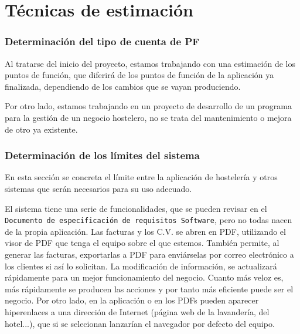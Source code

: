 \documentclass[spanish,a4paper,11pt, twoside]{report}	%
\begin{document}

\part{Técnicas de estimación} %
\section{Determinación del tipo de cuenta de PF}
Al tratarse del inicio del proyecto, estamos trabajando con una estimación de los puntos de función, que diferirá de los puntos de función de la aplicación ya finalizada, dependiendo de los cambios que se vayan produciendo. 

Por otro lado, estamos trabajando en un proyecto de desarrollo de un programa para la gestión de un negocio hostelero, no se trata del mantenimiento o mejora de otro ya existente.

\section{Determinación de los límites del sistema}
En esta sección se concreta el límite entre la aplicación de hostelería y otros sistemas que serán necesarios para su uso adecuado.

El sistema tiene una serie de funcionalidades, que se pueden revisar en el \texttt{Documento de especificación de requisitos Software}, pero no todas nacen de la propia aplicación. Las facturas y los C.V. se abren en PDF, utilizando el visor de PDF que tenga el equipo sobre el que estemos. También permite, al generar las facturas, exportarlas a PDF para enviárselas por correo electrónico a los clientes si así lo solicitan. La modificación de información, se actualizará rápidamente para un mejor funcionamiento del negocio. Cuanto más veloz es, más rápidamente se producen las acciones y por tanto más eficiente puede ser el negocio.
Por otro lado, en la aplicación o en los PDFs pueden aparecer hiperenlaces a una dirección de Internet (página web de la lavandería, del hotel...), que si se selecionan lanzarían el navegador por defecto del equipo.
\end{document}
